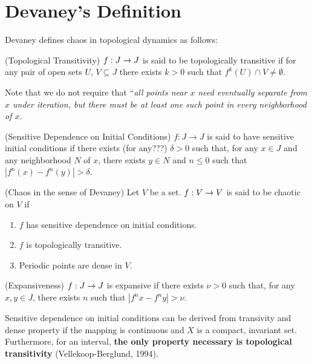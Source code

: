 \documentclass[11pt]{book}
\begin{document}
\chapter{Devaney's Definition}
Devaney defines chaos in topological dynamics as follows:

\begin{definition}
  (Topological Transitivity) $f: J \rightarrow J$ is said to be topologically
  transitive if for any pair of open sets $U$, $V \subseteq J$
  there exists $k > 0$ such that $f^k(U) \cap V \neq \emptyset$.
  \label{defn:transitivity}
\end{definition}

Note that we do not require that
``\it{all} points near $x$ need eventually separate from $x$
under iteration, but there must be at least one such point in
every neighborhood of $x$.
\begin{definition}
  (Sensitive Dependence on Initial Conditions) $f: J \rightarrow J$ 
  is said to have sensitive initial conditions if there exists (for any???) $\delta > 0$
  such that, for any $x \in J$ and any neighborhood $N$ of $x$,
  there exists $y\in N$ and $n\leq 0$ such that $|f^n(x) - f^n(y)|>\delta$.
  \label{defn:sdic}
\end{definition}

\begin{definition}
  (Chaos in the sense of Devaney) Let $V$ be a set. $f: V\rightarrow V$ is said to be chaotic on $V$ if
  \begin{enumerate}
    \item $f$ has sensitive dependence on initial conditions.
    \item $f$ is topologically transitive.
    \item Periodic points are dense in $V$.
  \end{enumerate}
\end{definition}


\begin{definition}
  (Expansiveness) $f: J\rightarrow J$ is expansive if there exists $\nu > 0$
  such that, for any $x,y\in J$, there exists $n$ such that
  $|f^nx-f^ny| > \nu$.
\end{definition}

Sensitive dependence on initial conditions can be derived from transivity and dense property if the mapping
is continuous and $X$ is a compact, invariant set. \cite{banks}
Furthermore, for an interval, {\bf the only property necessary is
topological transitivity} (Vellekoop-Berglund, 1994).
\end{document}
